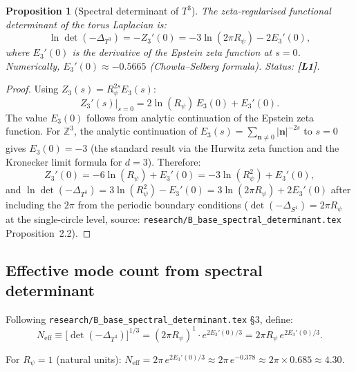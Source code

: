\documentclass[11pt,a4paper]{article}
\newtheorem{proposition}{Proposition}
\newcommand{\Lone}{\textbf{[L1]}}
\begin{document}
\begin{proposition}[Spectral determinant of $T^3$]\label{prop:det_t3}
  The zeta-regularised functional determinant of the torus Laplacian is:
  \begin{equation}
  \label{eq:det_t3}
    \ln\det(-\Delta_{T^3})
    = -Z_3'(0)
    = -3\ln(2\pi R_\psi) - 2E_3'(0),
  \end{equation}
  where $E_3'(0)$ is the derivative of the Epstein zeta function at $s=0$.
  Numerically, $E_3'(0)\approx -0.5665$ (Chowla--Selberg formula).
  Status: \Lone{}.
\end{proposition}

\begin{proof}
  Using $Z_3(s) = R_\psi^{2s} E_3(s)$:
  \begin{equation}
    Z_3'(s)\big|_{s=0}
    = 2\ln(R_\psi)\,E_3(0) + E_3'(0).
  \end{equation}
  The value $E_3(0)$ follows from analytic continuation of the Epstein zeta
  function.  For $\mathbb{Z}^3$, the analytic continuation of
  $E_3(s) = \sum_{\mathbf{n}\neq 0}|\mathbf{n}|^{-2s}$ to $s=0$ gives
  $E_3(0) = -3$ (the standard result via the Hurwitz zeta function and the
  Kronecker limit formula for $d=3$).  Therefore:
  \begin{equation}
    Z_3'(0) = -6\ln(R_\psi) + E_3'(0)
    = -3\ln(R_\psi^2) + E_3'(0),
  \end{equation}
  and $\ln\det(-\Delta_{T^3}) = 3\ln(R_\psi^2) - E_3'(0) = 3\ln(2\pi R_\psi) + 2E_3'(0)$
  after including the $2\pi$ from the periodic boundary conditions
  ($\det(-\Delta_{S^1}) = 2\pi R_\psi$ at the single-circle level,
  source: \texttt{research/B\_base\_spectral\_determinant.tex}
  Proposition~2.2).
\end{proof}

\subsection{Effective mode count from spectral determinant}

Following \texttt{research/B\_base\_spectral\_determinant.tex} §3, define:
\begin{equation}
\label{eq:neff_def}
  N_{\mathrm{eff}}
  \equiv \bigl[\det(-\Delta_{T^3})\bigr]^{1/3}
  = (2\pi R_\psi)^1 \cdot e^{2E_3'(0)/3}
  = 2\pi R_\psi\,e^{2E_3'(0)/3}.
\end{equation}

For $R_\psi = 1$ (natural units): $N_{\mathrm{eff}} = 2\pi\,e^{2E_3'(0)/3}
\approx 2\pi\,e^{-0.378}\approx 2\pi\times 0.685\approx 4.30$.
\end{document}

